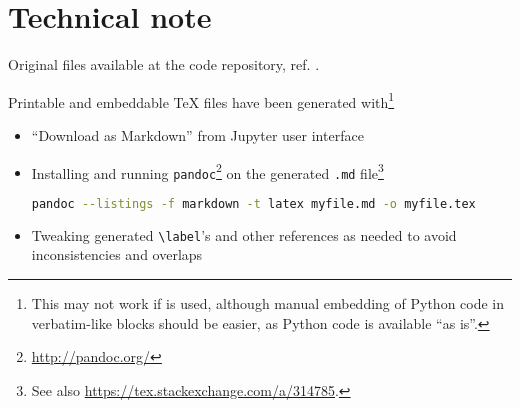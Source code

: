 \section*{Technical note}

Original files available at
the code repository, ref. \cite{OwnJupyterRepo}.

Printable and embeddable \TeX{} files have been generated with\footnote{
  This may not work if  \parencite{Jupytext} is used,
  although manual embedding of
  Python code in verbatim-like blocks should be easier, as Python code 
  is available ``as is''.
}
\begin{itemize}
  \item
    ``Download as Markdown''
    from Jupyter user interface
  \item
    Installing and running \verb#pandoc#\footnote{ \url{http://pandoc.org/}}
    on the generated \verb#.md# file\footnote{ See also \url{https://tex.stackexchange.com/a/314785}.}
    \begin{lstlisting}[language=Bash]
      pandoc --listings -f markdown -t latex myfile.md -o myfile.tex
    \end{lstlisting}
  \item
    Tweaking generated \verb#\label#'s and other references as needed to avoid inconsistencies and overlaps
\end{itemize}

